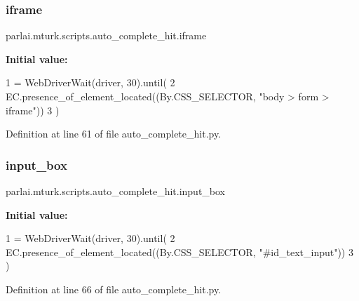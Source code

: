 \subsubsection{\texorpdfstring{iframe}{iframe}}
{\footnotesize\ttfamily parlai.\+mturk.\+scripts.\+auto\+\_\+complete\+\_\+hit.\+iframe}

{\bfseries Initial value\+:}
\begin{DoxyCode}
1 =  WebDriverWait(driver, 30).until(
2         EC.presence\_of\_element\_located((By.CSS\_SELECTOR, \textcolor{stringliteral}{"body > form > iframe"}))
3     )
\end{DoxyCode}


Definition at line 61 of file auto\+\_\+complete\+\_\+hit.\+py.

\mbox{\label{namespaceparlai_1_1mturk_1_1scripts_1_1auto__complete__hit_ac373c84090ad4712c390633f7ff3bb77}} 
\subsubsection{\texorpdfstring{input\+\_\+box}{input\_box}}
{\footnotesize\ttfamily parlai.\+mturk.\+scripts.\+auto\+\_\+complete\+\_\+hit.\+input\+\_\+box}

{\bfseries Initial value\+:}
\begin{DoxyCode}
1 =  WebDriverWait(driver, 30).until(
2         EC.presence\_of\_element\_located((By.CSS\_SELECTOR, \textcolor{stringliteral}{"#id\_text\_input"}))
3     )
\end{DoxyCode}


Definition at line 66 of file auto\+\_\+complete\+\_\+hit.\+py.

\mbox{\label{namespaceparlai_1_1mturk_1_1scripts_1_1auto__complete__hit_a841a3d5068e1ad07066a7ea28418b5ed}} 
